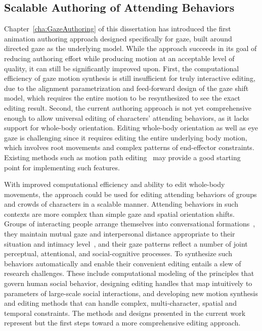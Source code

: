 \subsection{Scalable Authoring of Attending Behaviors}

Chapter~\ref{cha:GazeAuthoring} of this dissertation has introduced the first animation authoring approach designed specifically for gaze, built around directed gaze as the underlying model. While the approach succeeds in its goal of reducing authoring effort while producing motion at an acceptable level of quality, it can still be significantly improved upon. First, the computational efficiency of gaze motion synthesis is still insufficient for truly interactive editing, due to the alignment parametrization and feed-forward design of the gaze shift model, which requires the entire motion to be resynthesized to see the exact editing result. Second, the current authoring approach is not yet comprehensive enough to allow universal editing of characters' attending behaviors, as it lacks support for whole-body orientation. Editing whole-body orientation as well as eye gaze is challenging since it requires editing the entire underlying body motion, which involves root movements and complex patterns of end-effector constraints. Existing methods such as motion path editing~\citep{gleicher2001path} may provide a good starting point for implementing such features.

With improved computational efficiency and ability to edit whole-body movements, the approach could be used for editing attending behaviors of groups and crowds of characters in a scalable manner. Attending behaviors in such contexts are more complex than simple gaze and spatial orientation shifts. Groups of interacting people arrange themselves into conversational formations~\citep{kendon2010spacing}, they maintain mutual gaze and interpersonal distance appropriate to their situation and intimacy level~\citep{argyle1965eyecontact}, and their gaze patterns reflect a number of joint perceptual, attentional, and social-cognitive processes. To synthesize such behaviors automatically and enable their convenient editing entails a slew of research challenges. These include computational modeling of the principles that govern human social behavior, designing editing handles that map intuitively to parameters of large-scale social interactions, and developing new motion synthesis and editing methods that can handle complex, multi-character, spatial and temporal constraints. The methods and designs presented in the current work represent but the first steps toward a more comprehensive editing approach. 
